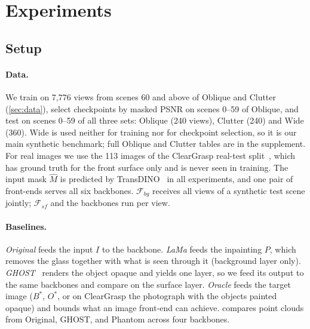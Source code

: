\section{Experiments}
\label{sec:experiments}


\subsection{Setup}
\label{sec:exp-setup}

\paragraph{Data.}
We train on 7,776 views from scenes 60 and above of Oblique and Clutter (\cref{sec:data}), select checkpoints by masked PSNR on scenes 0--59 of Oblique, and test on scenes 0--59 of all three sets: Oblique (240 views), Clutter (240) and Wide (360).
Wide is used neither for training nor for checkpoint selection, so it is our main synthetic benchmark; full Oblique and Clutter tables are in the supplement.
For real images we use the 113 images of the ClearGrasp real-test split~\cite{cleargrasp}, which has ground truth for the front surface only and is never seen in training.
The input mask $\hat M$ is predicted by TransDINO~\cite{ghost} in all experiments, and one pair of front-ends serves all six backbones.
$\mathcal{F}_{bg}$ receives all views of a synthetic test scene jointly; $\mathcal{F}_{sf}$ and the backbones run per view.

\paragraph{Baselines.}
\emph{Original} feeds the input $I$ to the backbone.
\emph{LaMa} feeds the inpainting $P$, which removes the glass together with what is seen through it (background layer only).
\emph{GHOST}~\cite{ghost} renders the object opaque and yields one layer, so we feed its output to the same backbones and compare on the surface layer.
\emph{Oracle} feeds the target image ($B^*$, $O^*$, or on ClearGrasp the photograph with the objects painted opaque) and bounds what an image front-end can achieve.
 compares point clouds from Original, GHOST, and Phantom across four backbones.

